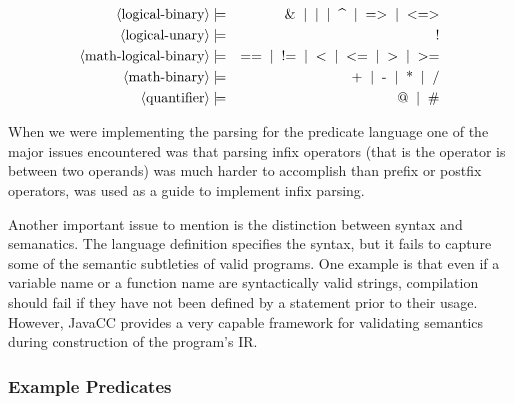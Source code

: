 \begin{eqnarray*}
%
	\pn{logical-binary} & \pp & \sm{\&}  \oo \sm{\textbar} \oo \sm{\textasciicircum} \oo \sm{=\textgreater} \oo \sm{\textless=\textgreater} \\
	\pn{logical-unary} & \pp & \sm{!} \\
	\pn{math-logical-binary} & \pp & \sm{==} \oo \sm{!=} \oo \sm{\textless} \oo \sm{\textless=} \oo \sm{\textgreater} \oo \sm{\textgreater=} \\
	\pn{math-binary} & \pp & \sm{+} \oo \sm{-} \oo \sm{*} \oo \sm{/} \\
%
%
	\pn{quantifier} & \pp & \sm{@} \oo \sm{\#} \\
\end{eqnarray*}

When we were implementing the parsing for the predicate language one of the major issues encountered was that parsing infix operators (that is the operator is between two operands) was much harder to accomplish than prefix or postfix operators, \cite{ParsingRecursiveDescent} was used as a guide to implement infix parsing.

Another important issue to mention is the distinction between syntax and semanatics. The language definition specifies the syntax, but it fails to capture some of the semantic subtleties of valid programs. One example is that even if a variable name or a function name are syntactically valid strings, compilation should fail if they have not been defined by a statement prior to their usage. However, JavaCC provides a very capable framework for validating semantics during construction of the program's IR.

\subsubsection{Example Predicates}
\label{sec:example-predicates}

